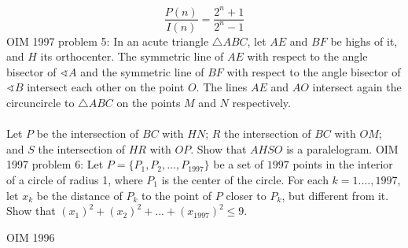 \[ \frac{P(n)}{I(n)}=\frac{2^n+1}{2^n-1} \] 
OIM 1997 problem 5:  In an acute triangle $\triangle{ABC}$, let $AE$ and $BF$ be highs of it, and $H$ its orthocenter. The symmetric line of $AE$ with respect to the angle bisector of $\sphericalangle{A}$ and the symmetric line of $BF$ with respect to the angle bisector of $\sphericalangle{B}$ intersect each other on the point $O$. The lines $AE$ and $AO$ intersect again the circuncircle to $\triangle{ABC}$ on the points $M$ and $N$ respectively. \\\\
Let $P$ be the intersection of $BC$ with $HN$; $R$ the intersection of $BC$ with $OM$; and $S$ the intersection of $HR$ with $OP$. Show that $AHSO$ is a paralelogram. 
OIM 1997 problem 6:  Let $P = \{P_1, P_2, ..., P_{1997}\}$ be a set of $1997$ points in the interior of a circle of radius 1, where $P_1$ is the center of the circle. For each $k=1.\ldots,1997$, let $x_k$ be the distance of $P_k$ to the point of $P$ closer to $P_k$, but different from it. Show that $(x_1)^2 + (x_2)^2 + ... + (x_{1997})^2 \le 9.$ 

OIM 1996 

